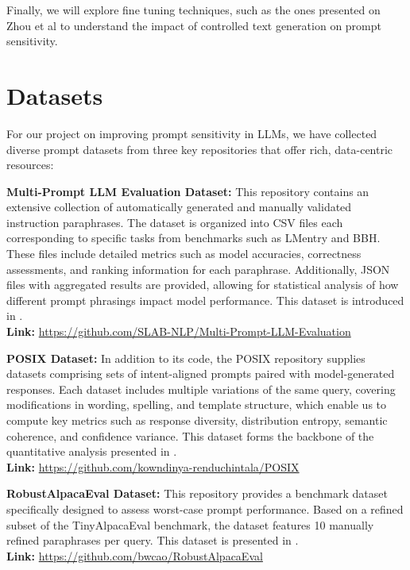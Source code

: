 \documentclass[fleqn,moreauthors,10pt]{ds_report}
\begin{document}
Finally, we will explore fine tuning techniques, such as the ones presented on Zhou et al \cite{zhou2023controlledtextgenerationnatural} to understand the impact of controlled text generation on prompt sensitivity.


\section*{Datasets}

For our project on improving prompt sensitivity in LLMs, we have collected diverse prompt datasets from three key repositories that offer rich, data-centric resources:

\textbf{Multi-Prompt LLM Evaluation Dataset:} This repository contains an extensive collection of automatically generated and manually validated instruction paraphrases. The dataset is organized into CSV files each corresponding to specific tasks from benchmarks such as LMentry and BBH. These files include detailed metrics such as model accuracies, correctness assessments, and ranking information for each paraphrase. Additionally, JSON files with aggregated results are provided, allowing for statistical analysis of how different prompt phrasings impact model performance. This dataset is introduced in \cite{mizrahi-etal-2024-state}.\\
\textbf{Link:} \url{https://github.com/SLAB-NLP/Multi-Prompt-LLM-Evaluation}

\vspace{1em}
\textbf{POSIX Dataset:} In addition to its code, the POSIX repository supplies datasets comprising sets of intent-aligned prompts paired with model-generated responses. Each dataset includes multiple variations of the same query, covering modifications in wording, spelling, and template structure, which enable us to compute key metrics such as response diversity, distribution entropy, semantic coherence, and confidence variance. This dataset forms the backbone of the quantitative analysis presented in \cite{chatterjee-etal-2024-posix}.\\
\textbf{Link:} \url{https://github.com/kowndinya-renduchintala/POSIX}

\vspace{1em}
\textbf{RobustAlpacaEval Dataset:} This repository provides a benchmark dataset specifically designed to assess worst-case prompt performance. Based on a refined subset of the TinyAlpacaEval benchmark, the dataset features 10 manually refined paraphrases per query. This dataset is presented in \cite{cao2024worstpromptperformancelarge}.\\
\textbf{Link:} \url{https://github.com/bwcao/RobustAlpacaEval}
\end{document}
